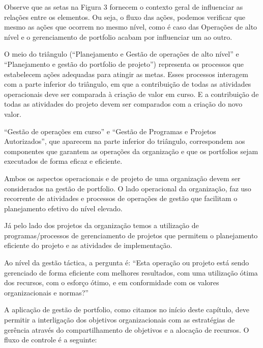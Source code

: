 \documentclass[12pt,a4paper,ruledheader,tocpage=prefix,floatnumber=continuous,pagestart=folhaderosto,font=times]{abnt}
\begin{document}
Observe que as setas na Figura 3 fornecem o contexto geral de influenciar as relações entre os elementos. Ou seja, o fluxo das ações, podemos verificar que mesmo as ações que ocorrem no mesmo nível, como é caso 
das Operações de alto nível e o gerenciamento de portfolio acabam por influenciar um ao outro.

O meio do triângulo (``Planejamento e Gestão de operações de alto nível'' e ``Planejamento e gestão do portfolio de projeto'') representa os processos 
que estabelecem ações adequadas para atingir as metas. Esses processos interagem com a parte inferior do triângulo, em que a contribuição de todas as 
atividades operacionais deve ser comparada à criação de valor em curso. E a contribuição de todas as atividades do projeto devem ser comparados com a 
criação do novo valor.

``Gestão de operações em curso'' e ``Gestão de Programas e Projetos Autorizados'', que aparecem na parte inferior do triângulo, correspondem aos 
componentes que garantem as operações da organização e que os portfolios sejam executados de forma eficaz e eficiente.\cite{sppm}

Ambos os aspectos operacionais e de projeto de uma organização devem ser considerados na gestão de portfolio. O lado operacional da organização, faz 
uso recorrente de atividades e processos de operações de gestão que facilitam o planejamento efetivo do nível elevado. 

Já pelo lado dos projetos da organização temos a utilização de programas/processos de gerenciamento de projetos que permitem o planejamento eficiente do 
projeto e as atividades de implementação.

Ao nível da gestão táctica, a pergunta é: ``Esta operação ou projeto está sendo gerenciado de forma eficiente com melhores resultados, com uma utilização 
ótima dos recursos, com o esforço ótimo, e em conformidade com os valores organizacionais e normas?''

A aplicação de gestão de portfolio, como citamos no início deste capítulo, deve permitir a interligação dos objetivos organizacionais com as estratégias de 
gerência através do compartilhamento de objetivos e a alocação de recursos. O fluxo de controle é a seguinte: \cite{sppm}
\end{document}
